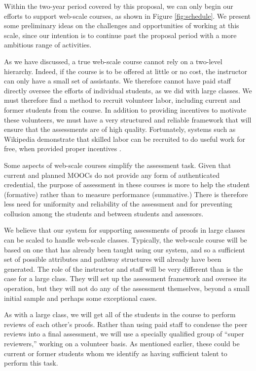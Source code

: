 \documentclass[12pt]{article}
\begin{document}
Within the two-year period covered by this proposal, we can only
begin our efforts to support web-scale courses, as shown in Figure
\ref{fig:schedule}.  We present some preliminary ideas on the
challenges and opportunities of working at this scale, since our
intention is to continue past the proposal period with a more
ambitious range of activities.

As we have discussed, a true web-scale course cannot rely on a
two-level hierarchy.  Indeed, if the course is to be offered at little
or no cost, the instructor can only have a small set of assistants.
We therefore cannot have paid staff directly oversee the efforts of
individual students, as we did with large classes.  We must therefore
find a method to recruit volunteer labor, including current and former
students from the course.  In addition to providing incentives to
motivate these volunteers, we must have a very structured and reliable
framework that will ensure that the assessments are of high quality.
Fortunately, systems such as Wikipedia demonstrate that skilled labor
can be recruited to do useful work for free, when provided proper incentives
\citep{nov-cacm07}.

Some aspects of web-scale courses simplify the assessment task.
Given that current and planned MOOCs do not provide
any form of authenticated credential, the purpose of assessment in
these courses is more to help the student (formative) rather than to
measure performance (summative.)  There is therefore less need for
uniformity and reliability of the assessment and for preventing
collusion among the students and between students and assessors.

We believe that our system for supporting assessments of proofs in
large classes can be scaled to handle web-scale classes.  Typically,
the web-scale course will be based on one that has already been
taught using our system, and so a sufficient set of possible attributes and
pathway structures will already have been generated.  The role of the
instructor and staff will be very different than is the case for a
large class.  They will set up the assessment framework and oversee
its operation, but they will not do any of the assessment themselves,
beyond a small initial sample and perhaps some exceptional cases.

As with a large class, we will get all of the students in the course
to perform reviews of each other's proofs.  Rather than using paid
staff to condense the peer reviews into a final assessment, we will
use a specially qualified group of ``super reviewers,'' working on a
volunteer basis.  As mentioned earlier, these could be current or
former students whom we identify as having sufficient talent to
perform this task.
\end{document}
